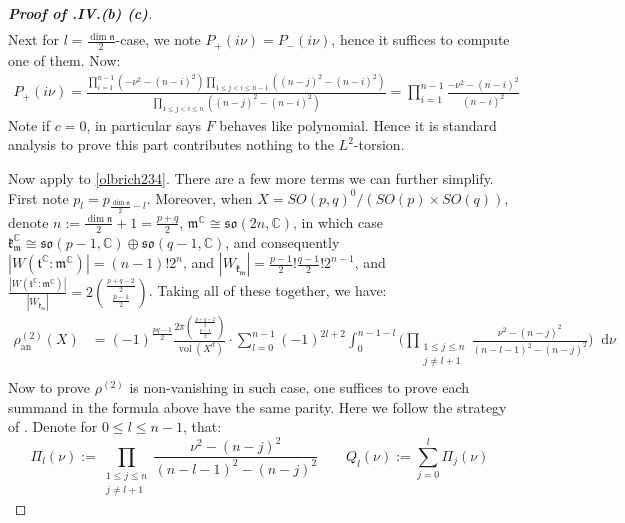 \documentclass[11pt]{report}
\theoremstyle{definition}
\theoremstyle{plain}
\DeclareMathOperator{\vol}{vol}
\newcommand{\complex}{\mathbb{C}}
\newcommand{\mass}[1]{\mathop{}\mathrm{d}{#1}}
\newcommand{\Lie}[1]{\mathfrak{#1}}
\begin{document}
\begin{proof}[\textbf{Proof of .IV.(b) (c)}]
\begin{equation}
\begin{split}
\end{split}
\end{equation}
Next for $l=\frac{\dim\Lie{n}}{2}$-case, we note $P_+(i\nu)=P_-(i\nu)$, hence it suffices to compute one of them. Now:
\begin{equation}
\begin{split}
P_+(i\nu)=\frac{\prod_{i=1}^{n-1}(-\nu^2-(n-i)^2)\prod_{1\leq j<i\leq n-1}((n-j)^2-(n-i)^2)}{\prod_{1\leq j<i\leq n}((n-j)^2-(n-i)^2)}=\prod_{i=1}^{n-1}\frac{-\nu^2-(n-i)^2}{(n-i)^2}
\end{split}
\end{equation}
Note if $c=0$,  in particular says $F$ behaves like polynomial. Hence it is standard analysis to prove this part contributes nothing to the $L^2$-torsion.
\par Now apply  to \ref{olbrich234}. There are a few more terms we can further simplify. First note $p_l=p_{\frac{\dim\Lie{n}}{2}-l}$.  Moreover, when $X=SO(p,q)^0/(SO(p)\times SO(q))$, denote $n:=\frac{\dim\Lie{n}}{2}+1=\frac{p+q}{2}$, $\Lie{m}^\complex\cong \Lie{so}(2n, \complex)$, in which case $\Lie{k}_\Lie{m}^\complex\cong \Lie{so}(p-1,\complex)\oplus \Lie{so}(q-1, \complex)$, and consequently $|W(\Lie{t}^\complex:\Lie{m}^\complex)|=(n-1)!2^{n}$, and $|W_\Lie{k_m}|=\frac{p-1}{2}!\frac{q-1}{2}!2^{n-1}$, and $\frac{|W(\Lie{t}^\complex:\Lie{m}^\complex)|}{|W_\Lie{k_m}|}=2{\frac{p+q-2}{2} \choose \frac{p-1}{2}}$. Taking all of these together, we have:
\begin{equation}\label{analytic torsion of so(p,q)}
\begin{split}
\rho^{(2)}_{\mathrm{an}}(X)
&=(-1)^{\frac{pq-1}{2}}\frac{2\pi{\frac{p+q-2}{2} \choose \frac{p-1}{2}}}{\vol(X^d)}\cdot\sum^{n-1}_{l=0}(-1)^{2l+2}\int_{0}^{n-1-l}\Big(\prod_{\substack{1\leq j\leq n\\ j\neq l+1}}\frac{\nu^2-(n-j)^2}{(n-l-1)^2-(n-j)^2}\Big)\mass{\nu}\\
\end{split}
\end{equation}
Now to prove $\rho^{(2)}$ is non-vanishing in such case, one suffices to prove each summand in the formula above have the same parity. Here we follow the strategy of \cite[5.9.1]{bergeron2013}. Denote for $0\leq l\leq n-1$, that:
\begin{equation*}
\Pi_l(\nu):=\prod_{\substack{1\leq j\leq n\\ j\neq l+1}}\frac{\nu^2-(n-j)^2}{(n-l-1)^2-(n-j)^2} \qquad Q_l(\nu):=\sum_{j=0}^l\Pi_j(\nu)
\end{equation*} 

\end{proof}
\end{document}
